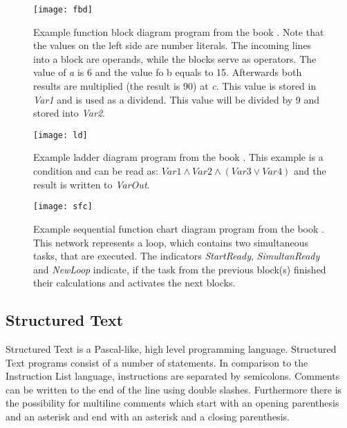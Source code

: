 \begin{figure}[h!]
	\centering
	\texttt{[image: fbd]}
	\caption{Example function block diagram program from the book \cite{johnIEC611313Programming2010}. Note that the values on the left side are number literals. The incoming lines into a block are operands, while the blocks serve as operators. The value of \emph{a} is 6 and the value fo b equals to 15. Afterwards both results are multiplied (the result is 90) at \emph{c}. This value is stored in \emph{Var1} and is used as a dividend. This value will be divided by 9 and stored into \emph{Var2}.}
	\label{code:fbd}
\end{figure}

\begin{figure}[h!]
	\centering
	\texttt{[image: ld]}
	\caption{Example ladder diagram program from the book \cite{johnIEC611313Programming2010}. This example is a condition and can be read as: $Var1 \land Var2 \land (Var3 \lor Var4)$ and the result is written to \emph{VarOut}. }
	\label{code:ld}
\end{figure}

\begin{figure}[h!]
	\centering
	\texttt{[image: sfc]}
	\caption{Example sequential function chart diagram program from the book \cite{johnIEC611313Programming2010}. This network represents a loop, which contains two simultaneous tasks, that are executed. The indicators \emph{StartReady}, \emph{SimultanReady} and \emph{NewLoop} indicate, if the task from the previous block(s) finished their calculations and activates the next blocks.}
	\label{code:sfc}
\end{figure}


\subsection{Structured Text}
\label{sub:structured text}
Structured Text is a Pascal-like, high level programming language.
Structured Text programs consist of a number of statements.  
In comparison to the Instruction List language, instructions are separated by semicolons. Comments can be written to the end of the line using double slashes. Furthermore there is the possibility for multiline comments which start with an opening parenthesis and an asterisk and end with an asterisk and a closing parenthesis.

